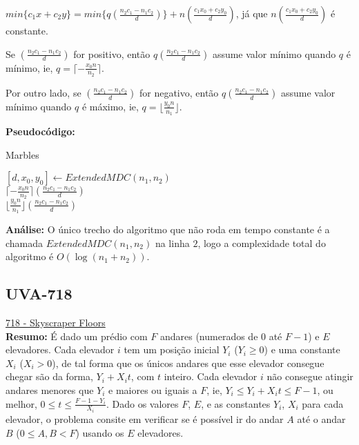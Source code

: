 $min\{c_1x+c_2y\} = min\big\{q(\frac{n_2c_1 - n_1c_2}{d})\big\} + n(\frac{c_1x_0+c_2y_0}{d})$, já que $n(\frac{c_1x_0+c_2y_0}{d})$ é constante. 
\newline

Se $(\frac{n_2c_1 - n_1c_2}{d})$ for positivo, então $q(\frac{n_2c_1 - n_1c_2}{d})$ assume valor mínimo quando $q$ é mínimo, ie, $q=\lceil -\frac{x_0n}{n_2} \rceil$.

Por outro lado, se $(\frac{n_2c_1 - n_1c_2}{d})$ for negativo, então $q(\frac{n_2c_1 - n_1c_2}{d})$ assume valor mínimo quando $q$ é máximo, ie, $q=\lfloor \frac{y_0n}{n_1} \rfloor$.
\newline

\textbf{Pseudocódigo:}
\begin{algorithm}
\caption{Marbles}
\begin{algorithmic}[1]

\State $[d,x_0,y_0] \gets ExtendedMDC(n_1,n_2)$
\\
\State \Return $\lceil -\frac{x_0n}{n_2} \rceil (\frac{n_2c_1 - n_1c_2}{d})$
\\
\Else
\State \Return $\lfloor \frac{y_0n}{n_1} \rfloor (\frac{n_2c_1 - n_1c_2}{d})$
\EndIf
\EndProcedure
\end{algorithmic}
\end{algorithm}
\newline

\textbf{Análise:}
O único trecho do algoritmo que não roda em tempo constante é a chamada $ExtendedMDC(n_1,n_2)$ na linha $2$, logo a complexidade total do algoritmo é $O(\log(n_1+n_2))$.
\newline




\subsection{UVA-718}
\href{https://uva.onlinejudge.org/index.php?option=com_onlinejudge&Itemid=8&page=show_problem&problem=659}{718 - Skyscraper Floors}\\

\textbf{Resumo:}
É dado um prédio com $F$ andares (numerados de $0$ até $F-1$) e $E$ elevadores. Cada elevador $i$ tem um posição inicial $Y_i$ ($Y_i \geq 0$) e uma constante $X_i$ ($X_i > 0$), 
de tal forma que os únicos andares que esse elevador consegue chegar são da forma, $Y_i+X_it$, com $t$ inteiro. 
Cada elevador $i$ não consegue atingir andares menores que $Y_i$ e maiores ou iguais a $F$, ie, $Y_i \leq Y_i+X_it \leq F-1$, ou melhor, $0 \leq t \leq \frac{F-1-Y_i}{X_i}$.
Dado os valores $F$, $E$, e as constantes $Y_i$, $X_i$ para cada elevador, o problema consite em verificar se é possível ir do andar $A$ até o andar $B$ ($0\leq A,B <F$)
usando os $E$ elevadores.
\\

